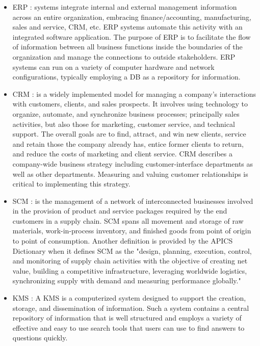 \documentclass[12pt,a4paper,final,twoside,onecolumn,titlepage]{book}
\begin{document}
\begin{itemize}
\item \gls{ERP} \cite{Wiki-ERP}: systems integrate internal and external management information across an entire organization, embracing finance/accounting, manufacturing, sales and service, \gls{CRM}, etc. \gls{ERP} systems automate this activity with an integrated software application. The purpose of \gls{ERP} is to facilitate the flow of information between all business functions inside the boundaries of the organization and manage the connections to outside stakeholders. \gls{ERP} systems can run on a variety of computer hardware and network configurations, typically employing a \gls{DB} as a repository for information.
\item \gls{CRM} \cite{Wiki-CRM}:  is a widely implemented model for managing a company's interactions with customers, clients, and sales prospects. It involves using technology to organize, automate, and synchronize business processes; principally sales activities, but also those for marketing, customer service, and technical support. The overall goals are to find, attract, and win new clients, service and retain those the company already has, entice former clients to return, and reduce the costs of marketing and client service. \gls{CRM} describes a company-wide business strategy including customer-interface departments as well as other departments. Measuring and valuing customer relationships is critical to implementing this strategy.
\item \gls{SCM} \cite{Wiki-SCM}: is the management of a network of interconnected businesses involved in the provision of product and service packages required by the end customers in a supply chain. \gls{SCM} spans all movement and storage of raw materials, work-in-process inventory, and finished goods from point of origin to point of consumption.
Another definition is provided by the APICS Dictionary when it defines \gls{SCM} as the "design, planning, execution, control, and monitoring of supply chain activities with the objective of creating net value, building a competitive infrastructure, leveraging worldwide logistics, synchronizing supply with demand and measuring performance globally."
\item \gls{KMS} \cite{Wiki-KMS}: A \gls{KMS} is a computerized system designed to support the creation, storage, and dissemination of information. Such a system contains a central repository of information that is well structured and employs a variety of effective and easy to use search tools that users can use to find answers to questions quickly. 

\end{itemize}
\end{document}
